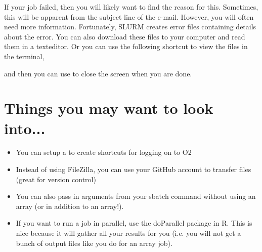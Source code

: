 \documentclass[11pt, oneside]{article}   	%
\begin{document}
\noindent If your job failed, then you will likely want to find the reason for this. Sometimes, this will be apparent from the subject line of the e-mail. However, you will often need more information. Fortunately, SLURM creates error files containing details about the error. You can also download these files to your computer and read them in a texteditor. Or you can use the following shortcut to view the files in the terminal, 

\begin{center}
\end{center}

\noindent and then you can use  \normalfont to close the screen when you are done. 

\section{Things you may want to look into...}

\begin{itemize}
	\item You can setup a  \normalfont to create shortcuts for logging on to O2
	\item Instead of using FileZilla, you can use your GitHub account to transfer files (great for version control)
	\item You can also pass in arguments from your sbatch command without using an array (or in addition to an array!). 
	\item If you want to run a job in parallel, use the doParallel package in R. This is nice because it will gather all your results for you (i.e. you will not get a bunch of output files like you do for an array job). 
\end{itemize}
\end{document}
